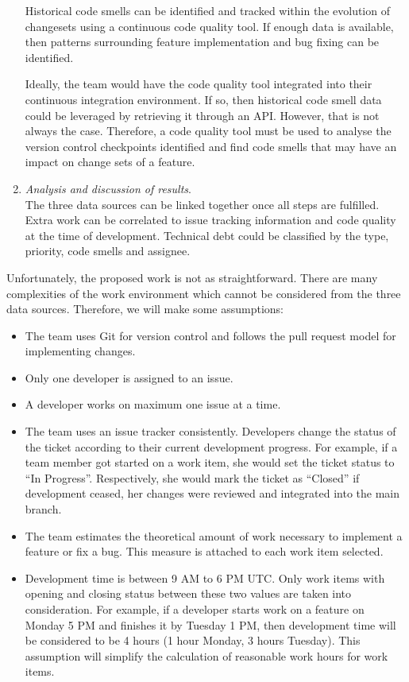 \documentclass{mprop}
\begin{document}
\begin{enumerate}
	      Historical code smells can be identified and tracked within the
	      evolution of changesets using a continuous code quality tool. If
	      enough data is available, then patterns surrounding feature
	      implementation and bug fixing can be identified.

	      Ideally, the team would have the code quality tool integrated into
	      their continuous integration environment. If so, then historical code
	      smell data could be leveraged by retrieving it through an API.
	      However, that is not always the case. Therefore, a code quality tool
	      must be used to analyse the version control checkpoints identified and
	      find code smells that may have an impact on change sets of a feature.

	\item \textit{Analysis and discussion of results}.\\
	      The three data sources can be linked together once all steps are
	      fulfilled. Extra work can be correlated to issue tracking information
	      and code quality at the time of development. Technical debt could be
	      classified by the type, priority, code smells and assignee.
\end{enumerate}

Unfortunately, the proposed work is not as straightforward. There are many
complexities of the work environment which cannot be considered from the three
data sources. Therefore, we will make some assumptions:
\begin{itemize}
	\item The team uses Git for version control and follows the pull request model
	      for implementing changes.
	\item Only one developer is assigned to an issue.
	\item A developer works on maximum one issue at a time.
	\item The team uses an issue tracker consistently. Developers change the
	      status of the ticket according to their current development progress.
	      For example, if a team member got started on a work item, she would
	      set the ticket status to ``In Progress''. Respectively, she would mark
	      the ticket as ``Closed'' if development ceased, her changes were
	      reviewed and integrated into the main branch.
	\item The team estimates the theoretical amount of work necessary to
	      implement a feature or fix a bug. This measure is attached to each
	      work item selected.
	\item Development time is between 9 AM to 6 PM UTC. Only work items with
	      opening and closing status between these two values are taken into
	      consideration. For example, if a developer starts work on a feature on
	      Monday 5 PM and finishes it by Tuesday 1 PM, then development time
	      will be considered to be 4 hours (1 hour Monday, 3 hours Tuesday).
	      This assumption will simplify the calculation of reasonable work hours
	      for work items.
\end{itemize}
\end{document}
